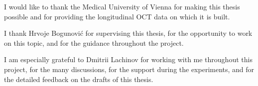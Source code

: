 
\cleardoubleoddpage%
\begin{acks*}
I would like to thank the Medical University of Vienna for making this
thesis possible and for providing the longitudinal OCT data on which it is
built.

I thank Hrvoje Bogunovi\'c for supervising this thesis, for the opportunity
to work on this topic, and for the guidance throughout the project.

I am especially grateful to Dmitrii Lachinov for working with me throughout
this project, for the many discussions, for the support during the
experiments, and for the detailed feedback on the drafts of this thesis.
\end{acks*}

